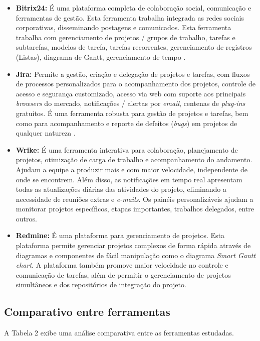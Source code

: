 \documentclass{acm_proc_article-sp}
\begin{document}
\begin{itemize}
\item \textbf{Bitrix24:} É uma plataforma completa de colaboração social, comunicação e ferramentas de gestão. Esta ferramenta trabalha integrada as redes sociais corporativas, disseminando postagens e comunicados. Esta ferramenta trabalha com gerenciamento de projetos / grupos de trabalho, tarefas e subtarefas, modelos de tarefa, tarefas recorrentes, gerenciamento de registros (Listas), diagrama de Gantt, gerenciamento de tempo \cite{bitrix24:ferramenta}.
\item \textbf{Jira:}  Permite a gestão, criação e delegação de projetos e tarefas, com fluxos de processos personalizados para o acompanhamento dos projetos, controle de acesso e segurança customizado, acesso via web com suporte aos principais \textit{browsers} do mercado, notificações / alertas por \textit{email},  centenas de \textit{plug-ins} gratuitos. É uma ferramenta robusta para gestão de projetos e tarefas, bem como para acompanhamento e reporte de defeitos (\textit{bugs}) em projetos de qualquer natureza \cite{jira:ferramenta}.
\item \textbf{Wrike:} É uma ferramenta interativa para colaboração, planejamento de projetos, otimização de carga de trabalho e acompanhamento do andamento. Ajudam a equipe a produzir mais e com maior velocidade, independente de onde se encontrem. Além disso, as notificações em tempo real apresentam todas as atualizações diárias das atividades do projeto, eliminando a necessidade de reuniões extras e \textit{e-mails}. Os painéis personalizáveis ajudam a monitorar projetos específicos, etapas importantes, trabalhos delegados, entre outros.  
\item \textbf{Redmine:} É uma plataforma para gerenciamento de projetos. Esta plataforma permite gerenciar projetos complexos de forma rápida através de diagramas e componentes de fácil manipulação como o diagrama \textit{Smart Gantt chart}. A plataforma também promove maior velocidade no controle e comunicação de tarefas, além de permitir o gerenciamento de projetos simultâneos e dos repositórios de integração do projeto.
\end{itemize}

\subsection{Comparativo entre ferramentas}
 A Tabela 2 exibe uma análise comparativa entre as ferramentas estudadas.
\end{document}
